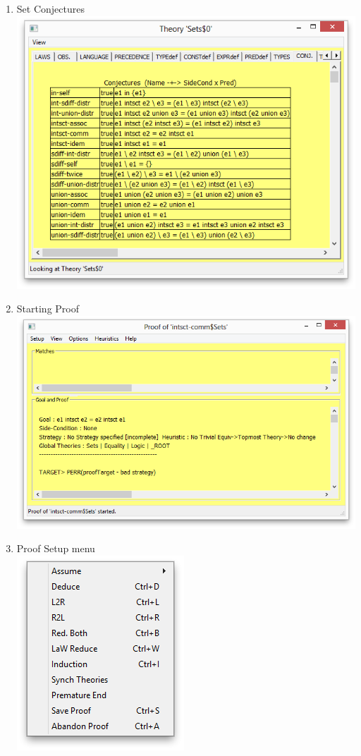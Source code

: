 \begin{enumerate}
  \newpage
  \item Set Conjectures
  \\\includegraphics[scale=0.5]{SCREENSHOTS/03-set-conjectures.png}
  \item Starting Proof
  \\\includegraphics[scale=0.5]{SCREENSHOTS/04-starting-proof.png}
  \newpage
  \item Proof Setup menu
  \\\includegraphics[scale=0.5]{SCREENSHOTS/05-proof-setup-menu.png}

\end{enumerate}

